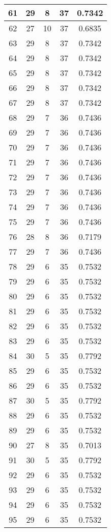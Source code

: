 \documentclass[letterpaper, 12pt]{article}
\begin{document}
\begin{longtable}{|c|c|c|c|c|}
61 & 29 & 8 & 37 & 0.7342 \\
\hline
62 & 27 & 10 & 37 & 0.6835 \\
\hline
63 & 29 & 8 & 37 & 0.7342 \\
\hline
64 & 29 & 8 & 37 & 0.7342 \\
\hline
65 & 29 & 8 & 37 & 0.7342 \\
\hline
66 & 29 & 8 & 37 & 0.7342 \\
\hline
67 & 29 & 8 & 37 & 0.7342 \\
\hline
68 & 29 & 7 & 36 & 0.7436 \\
\hline
69 & 29 & 7 & 36 & 0.7436 \\
\hline
70 & 29 & 7 & 36 & 0.7436 \\
\hline
71 & 29 & 7 & 36 & 0.7436 \\
\hline
72 & 29 & 7 & 36 & 0.7436 \\
\hline
73 & 29 & 7 & 36 & 0.7436 \\
\hline
74 & 29 & 7 & 36 & 0.7436 \\
\hline
75 & 29 & 7 & 36 & 0.7436 \\
\hline
76 & 28 & 8 & 36 & 0.7179 \\
\hline
77 & 29 & 7 & 36 & 0.7436 \\
\hline
78 & 29 & 6 & 35 & 0.7532 \\
\hline
79 & 29 & 6 & 35 & 0.7532 \\
\hline
80 & 29 & 6 & 35 & 0.7532 \\
\hline
81 & 29 & 6 & 35 & 0.7532 \\
\hline
82 & 29 & 6 & 35 & 0.7532 \\
\hline
83 & 29 & 6 & 35 & 0.7532 \\
\hline
84 & 30 & 5 & 35 & 0.7792 \\
\hline
85 & 29 & 6 & 35 & 0.7532 \\
\hline
86 & 29 & 6 & 35 & 0.7532 \\
\hline
87 & 30 & 5 & 35 & 0.7792 \\
\hline
88 & 29 & 6 & 35 & 0.7532 \\
\hline
89 & 29 & 6 & 35 & 0.7532 \\
\hline
90 & 27 & 8 & 35 & 0.7013 \\
\hline
91 & 30 & 5 & 35 & 0.7792 \\
\hline
92 & 29 & 6 & 35 & 0.7532 \\
\hline
93 & 29 & 6 & 35 & 0.7532 \\
\hline
94 & 29 & 6 & 35 & 0.7532 \\
\hline
95 & 29 & 6 & 35 & 0.7532 \\

\end{longtable}
\end{document}
